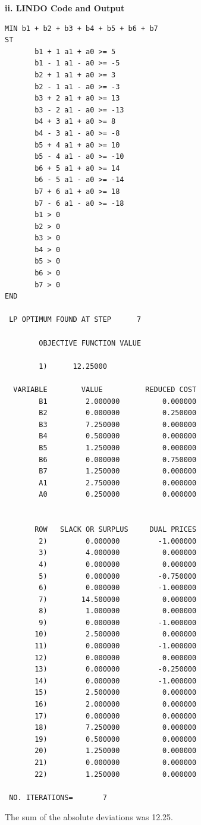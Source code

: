 \documentclass[paper=a4, fontsize=11pt]{scrartcl} %
\numberwithin{equation}{section} %
\numberwithin{figure}{section} %
\numberwithin{table}{section} %
\begin{document}
    \textbf{ii. LINDO Code and Output}\newline
    \begin{verbatim}
MIN b1 + b2 + b3 + b4 + b5 + b6 + b7
ST
	   b1 + 1 a1 + a0 >= 5
	   b1 - 1 a1 - a0 >= -5
	   b2 + 1 a1 + a0 >= 3
	   b2 - 1 a1 - a0 >= -3
	   b3 + 2 a1 + a0 >= 13
	   b3 - 2 a1 - a0 >= -13
	   b4 + 3 a1 + a0 >= 8
	   b4 - 3 a1 - a0 >= -8
	   b5 + 4 a1 + a0 >= 10
	   b5 - 4 a1 - a0 >= -10
	   b6 + 5 a1 + a0 >= 14
	   b6 - 5 a1 - a0 >= -14
	   b7 + 6 a1 + a0 >= 18
	   b7 - 6 a1 - a0 >= -18
	   b1 > 0
	   b2 > 0
	   b3 > 0
	   b4 > 0
	   b5 > 0
	   b6 > 0
	   b7 > 0
END

 LP OPTIMUM FOUND AT STEP      7

        OBJECTIVE FUNCTION VALUE

        1)      12.25000

  VARIABLE        VALUE          REDUCED COST
        B1         2.000000          0.000000
        B2         0.000000          0.250000
        B3         7.250000          0.000000
        B4         0.500000          0.000000
        B5         1.250000          0.000000
        B6         0.000000          0.750000
        B7         1.250000          0.000000
        A1         2.750000          0.000000
        A0         0.250000          0.000000


       ROW   SLACK OR SURPLUS     DUAL PRICES
        2)         0.000000         -1.000000
        3)         4.000000          0.000000
        4)         0.000000          0.000000
        5)         0.000000         -0.750000
        6)         0.000000         -1.000000
        7)        14.500000          0.000000
        8)         1.000000          0.000000
        9)         0.000000         -1.000000
       10)         2.500000          0.000000
       11)         0.000000         -1.000000
       12)         0.000000          0.000000
       13)         0.000000         -0.250000
       14)         0.000000         -1.000000
       15)         2.500000          0.000000
       16)         2.000000          0.000000
       17)         0.000000          0.000000
       18)         7.250000          0.000000
       19)         0.500000          0.000000
       20)         1.250000          0.000000
       21)         0.000000          0.000000
       22)         1.250000          0.000000

 NO. ITERATIONS=       7
    \end{verbatim}
    
    The sum of the absolute deviations was 12.25.\newline
    
\end{document}
